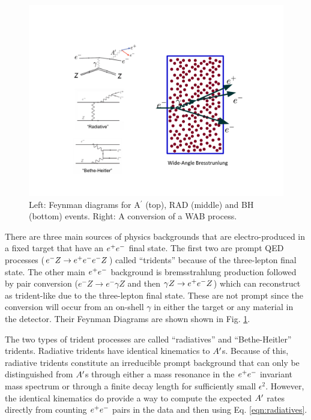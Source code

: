  \begin{figure}[!h]
    \centering
    \includegraphics[width=1.\textwidth]{figs/recon/feynman-diagram.pdf}
    \caption{Left: Feynman diagrams for A$^{'}$ (top), RAD (middle) and BH (bottom) events. Right: A conversion of a WAB process.}
    \label{fig:feynman-diagram}
\end{figure}
 
 There are three main sources of physics backgrounds that are electro-produced in a fixed target that have an $e^{+}e^{-}$ final state. The first two are prompt QED processes ($e^- Z \rightarrow e^{+}e^{-} e^- Z$) called ``tridents'' because of the three-lepton final state. The other main $e^{+}e^{-}$ background is bremsstrahlung production followed by pair conversion ($e^- Z \rightarrow e^- \gamma Z$ and then $\gamma Z \rightarrow e^{+}e^{-} Z$) which can reconstruct as trident-like due to the three-lepton final state. These are not prompt since the conversion will occur from an on-shell $\gamma$ in either the target or any material in the detector. Their Feynman Diagrams are shown shown in Fig. \ref{fig:feynman-diagram}.
 
 The two types of trident processes are called ``radiatives'' and ``Bethe-Heitler'' tridents. Radiative tridents have identical kinematics to $A^\prime$s. Because of this, radiative tridents constitute an irreducible prompt background that can only be distinguished from $A^\prime$s through either a mass resonance in the $e^{+}e^{-}$ invariant mass spectrum or through a finite decay length for sufficiently small $\epsilon^2$. However, the identical kinematics do provide a way to compute the expected $A^\prime$ rates directly from counting $e^{+}e^{-}$ pairs in the data and then using Eq. \ref{eqn:radiatives}.
 
